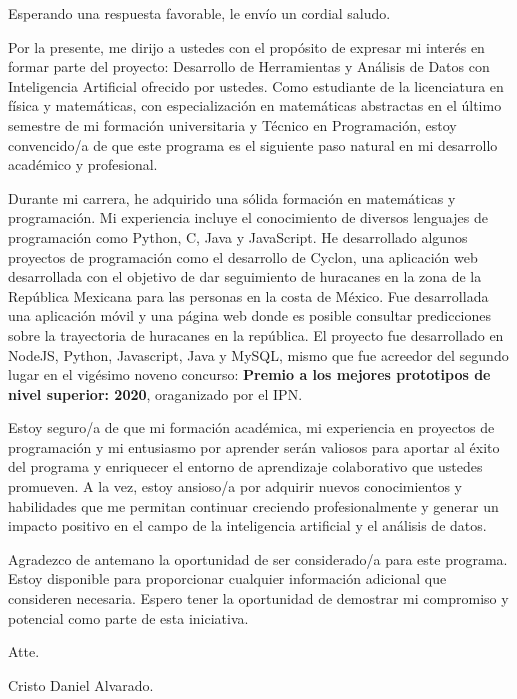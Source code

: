 \documentclass[11pt,a4paper,sans]{moderncv}        %
\begin{document}
\date{1 de enero de 2025}
\opening{}
\closing{Esperando una respuesta favorable, le envío un cordial saludo.}

\makelettertitle

\justifying

Por la presente, me dirijo a ustedes con el propósito de expresar mi interés en formar parte del proyecto: Desarrollo de Herramientas y Análisis de Datos con Inteligencia Artificial ofrecido por ustedes. Como estudiante de la licenciatura en física y matemáticas, con especialización en matemáticas abstractas en el último semestre de mi formación universitaria y Técnico en Programación, estoy convencido/a de que este programa es el siguiente paso natural en mi desarrollo académico y profesional.

Durante mi carrera, he adquirido una sólida formación en matemáticas y programación. Mi experiencia incluye el conocimiento de diversos lenguajes de programación como Python, C, Java y JavaScript. He desarrollado algunos proyectos de programación como el desarrollo de Cyclon, una aplicación web desarrollada con el objetivo de dar seguimiento de huracanes en la zona de la República Mexicana para las personas en la costa de México. Fue desarrollada una aplicación móvil y una página web donde es posible consultar predicciones sobre la trayectoria de huracanes en la república. El proyecto fue desarrollado en NodeJS, Python, Javascript, Java y MySQL, mismo que fue acreedor del segundo lugar en el vigésimo noveno concurso: \textbf{Premio a los mejores prototipos de nivel superior: 2020}, oraganizado por el IPN.

Estoy seguro/a de que mi formación académica, mi experiencia en proyectos de programación y mi entusiasmo por aprender serán valiosos para aportar al éxito del programa y enriquecer el entorno de aprendizaje colaborativo que ustedes promueven. A la vez, estoy ansioso/a por adquirir nuevos conocimientos y habilidades que me permitan continuar creciendo profesionalmente y generar un impacto positivo en el campo de la inteligencia artificial y el análisis de datos.

Agradezco de antemano la oportunidad de ser considerado/a para este programa. Estoy disponible para proporcionar cualquier información adicional que consideren necesaria. Espero tener la oportunidad de demostrar mi compromiso y potencial como parte de esta iniciativa.

Atte.

Cristo Daniel Alvarado.
\end{document}

